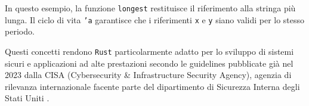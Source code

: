 In questo esempio, la funzione \texttt{longest} restituisce il riferimento alla stringa più lunga. Il ciclo di vita \texttt{'a} garantisce che i riferimenti \texttt{x} e \texttt{y} siano validi per lo stesso periodo.

Questi concetti rendono \texttt{Rust} particolarmente adatto per lo sviluppo di sistemi sicuri e applicazioni ad alte prestazioni secondo le guidelines pubblicate già nel 2023 dalla CISA (Cybersecurity \& Infrastructure Security Agency), agenzia di rilevanza internazionale facente parte del dipartimento di Sicurezza Interna degli Stati Uniti \cite{CISA}.
